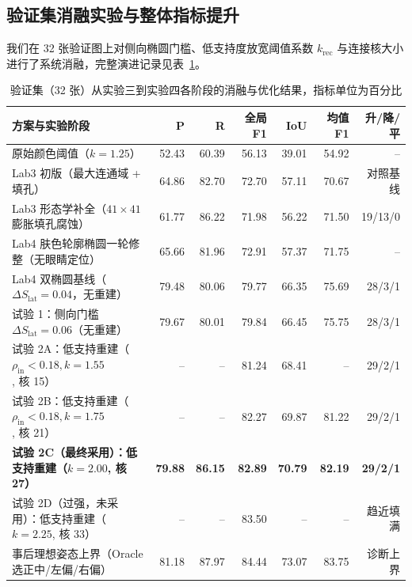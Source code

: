 \subsection{验证集消融实验与整体指标提升}

我们在 32 张验证图上对侧向椭圆门槛、低支持度放宽阈值系数 $k_{\text{rec}}$ 与连接核大小进行了系统消融，完整演进记录见表~\ref{tab:lab4_ablation}。

\begin{table}[H]
\centering\footnotesize
\setlength{\tabcolsep}{3pt}
\caption{验证集（32 张）从实验三到实验四各阶段的消融与优化结果，指标单位为百分比}\label{tab:lab4_ablation}
\begin{tabular}{lrrrrrr}
\toprule
方案与实验阶段 & P & R & 全局 F1 & IoU & 均值 F1 & 升/降/平 \\
\midrule
原始颜色阈值（$k=1.25$） & 52.43 & 60.39 & 56.13 & 39.01 & 54.92 & -- \\
Lab3 初版（最大连通域 + 填孔） & 64.86 & 82.70 & 72.70 & 57.11 & 70.67 & 对照基线 \\
Lab3 形态学补全（$41\times41$ 膨胀填孔腐蚀） & 61.77 & 86.22 & 71.98 & 56.22 & 71.50 & 19/13/0 \\
Lab4 肤色轮廓椭圆一轮修整（无眼睛定位） & 65.66 & 81.96 & 72.91 & 57.37 & 71.75 & -- \\
Lab4 双椭圆基线（$\Delta S_{\text{lat}}=0.04$，无重建） & 79.48 & 80.06 & 79.77 & 66.35 & 75.69 & 28/3/1 \\
试验 1：侧向门槛 $\Delta S_{\text{lat}}=0.06$（无重建） & 79.67 & 80.01 & 79.84 & 66.45 & 75.75 & 28/3/1 \\
试验 2A：低支持重建（$\rho_{\text{in}}<0.18, k=1.55$, 核 15） & -- & -- & 81.24 & 68.41 & -- & 29/2/1 \\
试验 2B：低支持重建（$\rho_{\text{in}}<0.18, k=1.75$, 核 21） & -- & -- & 82.27 & 69.87 & 81.22 & 29/2/1 \\
\textbf{试验 2C（最终采用）：低支持重建（$k=2.00$, 核 27）} & \textbf{79.88} & \textbf{86.15} & \textbf{82.89} & \textbf{70.79} & \textbf{82.19} & \textbf{29/2/1} \\
试验 2D（过强，未采用）：低支持重建（$k=2.25$, 核 33） & -- & -- & 83.50 & -- & -- & 趋近填满 \\
事后理想姿态上界（Oracle 选正中/左偏/右偏） & 81.18 & 87.97 & 84.44 & 73.07 & 83.75 & 诊断上界 \\
\bottomrule
\end{tabular}
\end{table}

